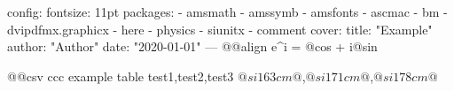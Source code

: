 config:
  fontsize: 11pt
  packages:
    - amsmath
    - amssymb
    - amsfonts
    - ascmac
    - bm
    - dvipdfmx.graphicx
    - here
    - physics
    - siunitx
    - comment
cover:
  title: "Example"
  author: "Author"
  date: "2020-01-01"
---
@@align
e^{i\pi} = @cos \pi@ + i@sin 


@@csv ccc
example table
test1,test2,test3
$@si 163 cm@$,$@si 171 cm@$,$@si 178 cm@$
